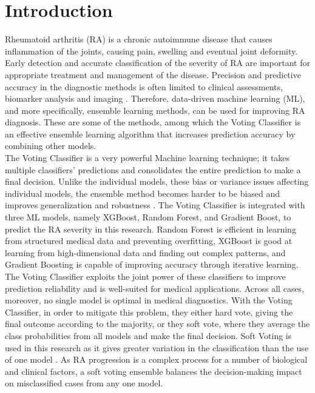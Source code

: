 \documentclass[10pt]{NSP1}
\begin{document}
	\section{Introduction}
	Rheumatoid arthritis (RA) is a chronic autoimmune disease that causes inflammation of the joints, causing pain, swelling and eventual joint deformity. Early detection and accurate classification of the severity of RA are important for appropriate treatment and management of the disease. Precision and predictive accuracy in the diagnostic methods is often limited to clinical assessments, biomarker analysis and imaging \cite{ghoniem2021multi}. Therefore, data-driven machine learning (ML), and more specifically, ensemble learning methods, can be used for improving RA diagnosis. These are some of the methods, among which the Voting Classifier is an effective ensemble learning algorithm that increases prediction accuracy by combining other models.\\
	The Voting Classifier is a very powerful Machine learning technique; it takes multiple classifiers' predictions and consolidates the entire prediction to make a final decision. Unlike the individual models, these bias or variance issues affecting individual models, the ensemble method becomes harder to be biased and improves generalization and robustness \cite{togninalli2023multi}. The Voting Classifier is integrated with three ML models, namely XGBoost, Random Forest, and Gradient Boost, to predict the RA severity in this research. Random Forest is efficient in learning from structured medical data and preventing overfitting, XGBoost is good at learning from high-dimensional data and finding out complex patterns, and Gradient Boosting is capable of improving accuracy through iterative learning.\\
	The Voting Classifier exploits the joint power of these classifiers to improve prediction reliability and is well-suited for medical applications. Across all cases, moreover, no single model is optimal in medical diagnostics. With the Voting Classifier, in order to mitigate this problem, they either hard vote, giving the final outcome according to the majority, or they soft vote, where they average the class probabilities from all models and make the final decision. Soft Voting is used in this research as it gives greater variation in the classification than the use of one model \cite{charan2022vision}. As RA progression is a complex process for a number of biological and clinical factors, a soft voting ensemble balances the decision-making impact on misclassified cases from any one model.\\
\end{document}
